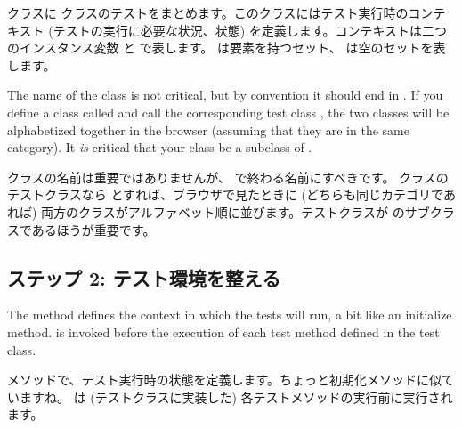 \documentclass[a4paper,10pt,twoside]{book}
\begin{document}
 クラスに  クラスのテストをまとめます。このクラスにはテスト実行時のコンテキスト (テストの実行に必要な状況、状態) を定義します。コンテキストは二つのインスタンス変数  と  で表します。  は要素を持つセット、  は空のセットを表します。

The name of the class is not critical, but by convention it should end in .
If you define a class called  and call the corresponding test class , the two classes will be alphabetized together in the browser (assuming that they are in the same category).  It \emph{is} critical that your class be a subclass of .
\fi

クラスの名前は重要ではありませんが、  で終わる名前にすべきです。  クラスのテストクラスなら  とすれば、ブラウザで見たときに (どちらも同じカテゴリであれば) 両方のクラスがアルファベット順に並びます。テストクラスが  のサブクラスであるほうが重要です。


\subsection{ステップ 2: テスト環境を整える}

The method  defines the context in which the tests will run, a bit like an initialize method.
 is invoked before the execution of each test
method defined in the test class.
\fi

 メソッドで、テスト実行時の状態を定義します。ちょっと初期化メソッドに似ていますね。  は (テストクラスに実装した) 各テストメソッドの実行前に実行されます。


\fi

\end{document}
